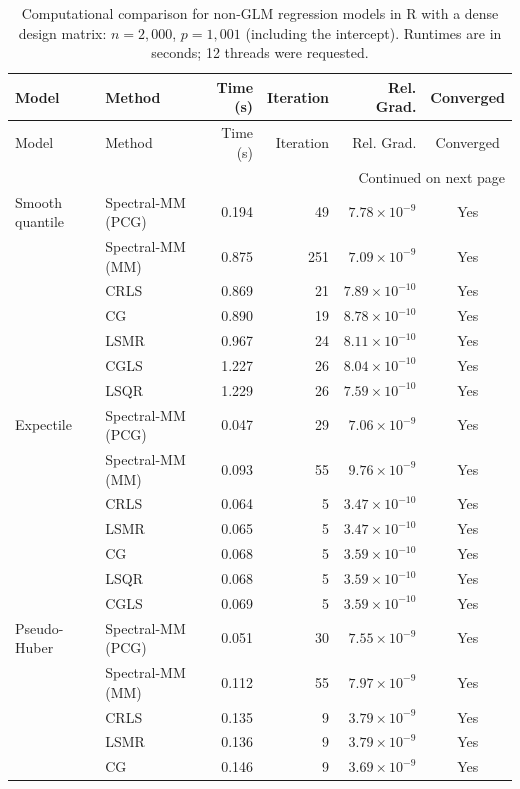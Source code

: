 \begingroup
\small
\setlength{\tabcolsep}{5pt}
\begin{longtable}{llrrrc}
\caption{Computational comparison for non-GLM regression models in R with a dense design matrix: $n=2{,}000$, $p=1{,}001$ (including the intercept). Runtimes are in seconds; 12 threads were requested.}
\label{tab:R-dense-nonglm-strict}\\
\toprule
Model & Method & Time (s) & Iteration & Rel. Grad. & Converged \\
\midrule
\endfirsthead
\toprule
Model & Method & Time (s) & Iteration & Rel. Grad. & Converged \\
\midrule
\endhead
\midrule
\multicolumn{6}{r}{Continued on next page}\\
\endfoot
\bottomrule
\endlastfoot
Smooth quantile & Spectral-MM (PCG) & 0.194 & 49 & $7.78\times10^{-9}$ & Yes \\
 & Spectral-MM (MM) & 0.875 & 251 & $7.09\times10^{-9}$ & Yes \\
 & CRLS & 0.869 & 21 & $7.89\times10^{-10}$ & Yes \\
 & CG & 0.890 & 19 & $8.78\times10^{-10}$ & Yes \\
 & LSMR & 0.967 & 24 & $8.11\times10^{-10}$ & Yes \\
 & CGLS & 1.227 & 26 & $8.04\times10^{-10}$ & Yes \\
 & LSQR & 1.229 & 26 & $7.59\times10^{-10}$ & Yes \\
\midrule
Expectile & Spectral-MM (PCG) & 0.047 & 29 & $7.06\times10^{-9}$ & Yes \\
 & Spectral-MM (MM) & 0.093 & 55 & $9.76\times10^{-9}$ & Yes \\
 & CRLS & 0.064 & 5 & $3.47\times10^{-10}$ & Yes \\
 & LSMR & 0.065 & 5 & $3.47\times10^{-10}$ & Yes \\
 & CG & 0.068 & 5 & $3.59\times10^{-10}$ & Yes \\
 & LSQR & 0.068 & 5 & $3.59\times10^{-10}$ & Yes \\
 & CGLS & 0.069 & 5 & $3.59\times10^{-10}$ & Yes \\
\midrule
Pseudo-Huber & Spectral-MM (PCG) & 0.051 & 30 & $7.55\times10^{-9}$ & Yes \\
 & Spectral-MM (MM) & 0.112 & 55 & $7.97\times10^{-9}$ & Yes \\
 & CRLS & 0.135 & 9 & $3.79\times10^{-9}$ & Yes \\
 & LSMR & 0.136 & 9 & $3.79\times10^{-9}$ & Yes \\
 & CG & 0.146 & 9 & $3.69\times10^{-9}$ & Yes \\

\end{longtable}
